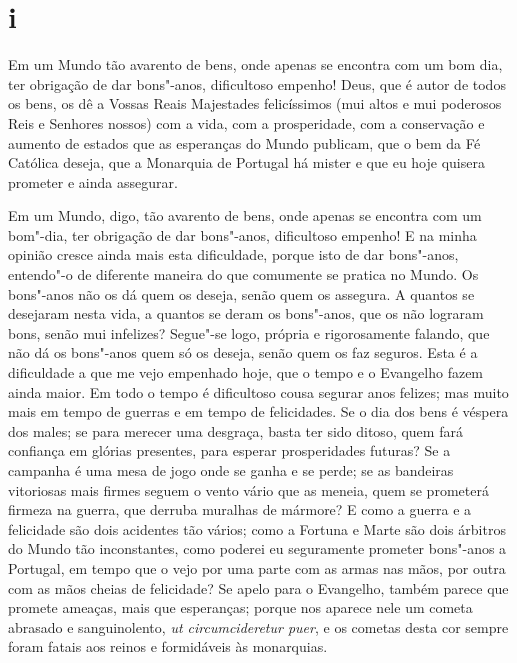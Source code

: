 \section*{i}

\noindent{}Em um Mundo tão avarento de bens, onde apenas se encontra com um bom
dia, ter obrigação de dar bons"-anos, dificultoso empenho! Deus, que é
autor de todos os bens, os dê a Vossas Reais Majestades felicíssimos
(mui altos e mui poderosos Reis e Senhores nossos) com a vida, com a
prosperidade, com a conservação e aumento de estados que as esperanças
do Mundo publicam, que o bem da Fé Católica deseja, que a Monarquia de
Portugal há mister e que eu hoje quisera prometer e ainda assegurar.

Em um Mundo, digo, tão avarento de bens, onde apenas se encontra com um
bom"-dia, ter obrigação de dar bons"-anos, dificultoso empenho! E na minha
opinião cresce ainda mais esta dificuldade, porque isto de dar
bons"-anos, entendo"-o de diferente maneira do que comumente se pratica no
Mundo. Os bons"-anos não os dá quem os deseja, senão quem os assegura. A
quantos se desejaram nesta vida, a quantos se deram os bons"-anos, que os
não lograram bons, senão mui infelizes? Segue"-se logo, própria e
rigorosamente falando, que não dá os bons"-anos quem só os deseja, senão
quem os faz seguros. Esta é a dificuldade a que me vejo empenhado hoje,
que o tempo e o Evangelho fazem ainda maior. Em todo o tempo é
dificultoso cousa segurar anos felizes; mas muito mais em tempo de
guerras e em tempo de felicidades. Se o dia dos bens é véspera dos
males; se para merecer uma desgraça, basta ter sido ditoso, quem fará
confiança em glórias presentes, para esperar prosperidades futuras? Se a
campanha é uma mesa de jogo onde se ganha e se perde; se as bandeiras
vitoriosas mais firmes seguem o vento vário que as meneia, quem se
prometerá firmeza na guerra, que derruba muralhas de mármore? E como a
guerra e a felicidade são dois acidentes tão vários; como a Fortuna e
Marte são dois árbitros do Mundo tão inconstantes, como poderei eu
seguramente prometer bons"-anos a Portugal, em tempo que o vejo por uma
parte com as armas nas mãos, por outra com as mãos cheias de felicidade?
Se apelo para o Evangelho, também parece que promete ameaças, mais que
esperanças; porque nos aparece nele um cometa abrasado e sanguinolento,
\emph{ut circumcideretur puer}, e os cometas desta cor sempre foram
fatais aos reinos e formidáveis às monarquias.

